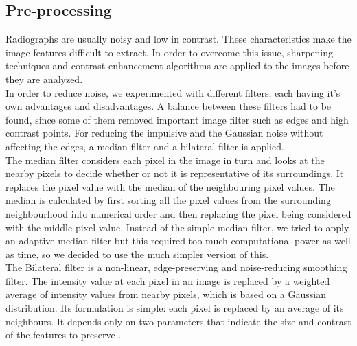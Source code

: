 \documentclass[a4paper]{article}
\begin{document}
\subsection{Pre-processing}
Radiographs are usually noisy and low in contrast. These characteristics make the image features difficult to extract. In order to overcome this issue, sharpening techniques and contrast enhancement algorithms are applied to the images before they are analyzed. \\
In order to reduce noise, we experimented with different filters, each having it's own advantages and disadvantages. A balance between these filters had to be found, since some of them removed important image filter such as edges and high contrast points. For reducing the impulsive and the Gaussian noise without affecting the edges, a median filter and a bilateral filter is applied.\\
The median filter considers each pixel in the image in turn and looks at the nearby pixels to decide whether or not it is representative of its surroundings. It replaces the pixel value with the median of the neighbouring pixel values. The median is calculated by first sorting all the pixel values from the surrounding neighbourhood into numerical order and then replacing the pixel being considered with the middle pixel value.  Instead of the simple median filter, we tried to apply an adaptive median filter but this required too much computational power as well as time, so we decided to use the much simpler version of this. \\
The Bilateral filter is a non-linear, edge-preserving and noise-reducing smoothing filter. The intensity value at each pixel in an image is replaced by a weighted average of intensity values from nearby pixels, which is based on a Gaussian distribution. Its formulation is simple: each pixel is replaced by an average of its neighbours. It depends only on two parameters that indicate the size and contrast of the features to preserve \cite{paris}.\\

\end{document}
